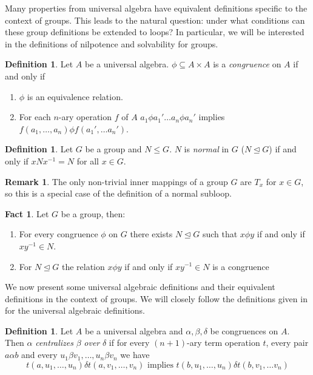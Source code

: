\documentclass[12pt, twoside, openright]{report}
\theoremstyle{definition}
\newtheorem{fct}[thm]{Fact}
\newtheorem{dfn}[thm]{Definition}
\newtheorem*{rmk}{Remark}
\begin{document}
Many properties from universal algebra have equivalent definitions specific to the context of groups.
  This leads to the natural question: under what conditions can these group definitions be extended
  to loops? In particular, we will be interested in the definitions of nilpotence and solvability
  for groups.

\begin{dfn}
  Let $A$ be a universal algebra. $\phi\subseteq A\times A$ is a \emph{congruence} on $A$ if and only if
  \begin{enumerate}
    \item $\phi$ is an equivalence relation.
    \item For each $n$-ary operation $f$ of $A$ $a_1 \phi a_1'\ldots a_n\phi a_n'$ implies
      $f(a_1, \ldots, a_n)\phi f(a_1', \ldots a_n')$.
  \end{enumerate}
\end{dfn}

\begin{dfn}
  Let $G$ be a group and $N\leq G$. $N$ is \emph{normal} in $G$ ($N\unlhd G$) if and
    only if $xNx^{-1} = N$ for all $x\in G$.
\end{dfn}

\begin{rmk}
  The only non-trivial inner mappings of a group $G$ are $T_x$ for $x\in G$, so this is a
    special case of the definition of a normal subloop.
\end{rmk}

\begin{fct}
  Let $G$ be a group, then:
  \begin{enumerate}
    \item For every congruence $\phi$ on $G$ there exists $N\unlhd G$ such that
      $x\phi y$ if and only if $xy^{-1}\in N$.
    \item For $N\unlhd G$ the relation $x\phi y$ if and only if $xy^{-1}\in N$ is a congruence \cite{univAlg} 
  \end{enumerate}
\end{fct}

We now present some universal algebraic definitions and their equivalent definitions in the context of
  groups. We will closely follow the definitions given in \cite{ComTheory} for the universal
  algebraic definitions.

\begin{dfn}
  Let $A$ be a universal algebra and $\alpha, \beta, \delta$ be congruences on $A$. Then
    $\alpha$ \emph{centralizes} $\beta$ \emph{over} $\delta$ if for every $(n + 1)$-ary term
    operation $t$, every pair $a\alpha b$ and every $u_1\beta v_1, \ldots, u_n \beta v_n$ we have
  \[t(a, u_1, \ldots, u_n) \delta t(a, v_1, \ldots, v_n)\text{ implies } t(b, u_1, \ldots, u_n)\delta t(b, v_1, \ldots v_n)\]
\end{dfn}
\end{document}
